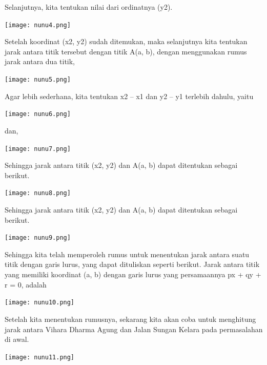 \documentclass[11pt,fleqn]{book} %
\begin{document}
Selanjutnya, kita tentukan nilai dari ordinatnya (y2).

\begin{center}
\texttt{[image: nunu4.png]}
\end{center}

Setelah koordinat (x2, y2) sudah ditemukan, maka selanjutnya kita tentukan jarak antara titik tersebut dengan titik A(a, b), dengan menggunakan rumus jarak antara dua titik,

\begin{center}
\texttt{[image: nunu5.png]}
\end{center}

Agar lebih sederhana, kita tentukan x2 – x1 dan y2 – y1 terlebih dahulu, yaitu

\begin{center}
\texttt{[image: nunu6.png]}
\end{center}

dan,

\begin{center}
\texttt{[image: nunu7.png]}
\end{center}

Sehingga jarak antara titik (x2, y2) dan A(a, b) dapat ditentukan sebagai berikut.

\begin{center}
\texttt{[image: nunu8.png]}
\end{center}

Sehingga jarak antara titik (x2, y2) dan A(a, b) dapat ditentukan sebagai berikut.

\begin{center}
\texttt{[image: nunu9.png]}
\end{center}

Sehingga kita telah memperoleh rumus untuk menentukan jarak antara suatu titik dengan garis lurus, yang dapat dituliskan seperti berikut.
Jarak antara titik yang memiliki koordinat (a, b) dengan garis lurus yang persamaannya px + qy + r = 0, adalah

\begin{center}
\texttt{[image: nunu10.png]}
\end{center}

Setelah kita menentukan rumusnya, sekarang kita akan coba untuk menghitung jarak antara Vihara Dharma Agung dan Jalan Sungan Kelara pada permasalahan di awal.

\begin{center}
\texttt{[image: nunu11.png]}
\end{center}
\end{document}
